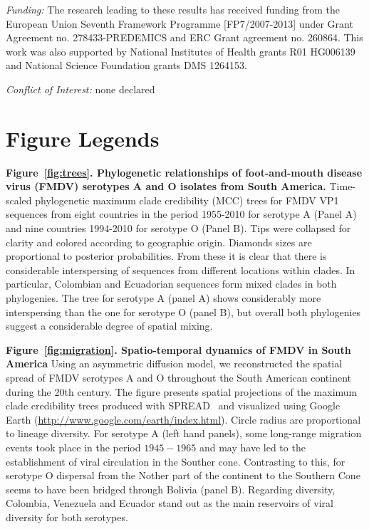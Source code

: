 \documentclass[10pt]{article}
\begin{document}
\emph{Funding:} The research leading to these results has received funding from the European Union Seventh Framework Programme [FP7/2007-2013] under Grant Agreement no. 278433-PREDEMICS and ERC Grant agreement no. 260864.
This work was also supported by National Institutes of Health grants R01 HG006139 and National Science Foundation grants DMS 1264153.

\emph{Conflict of Interest:} none declared

\newpage

\newpage
\section*{Figure Legends}


{\bf Figure~\ref{fig:trees}. Phylogenetic relationships of foot-and-mouth disease virus (FMDV) serotypes A and O isolates from South America.} Time-scaled phylogenetic maximum clade credibility (MCC) trees for FMDV VP1 sequences from eight countries in the period 1955-2010 for serotype A (Panel A) and nine countries 1994-2010 for serotype O (Panel B).
Tips were collapsed for clarity and colored according to geographic origin.
Diamonds sizes are proportional to posterior probabilities.
From these it is clear that there is considerable interspersing of sequences from different locations within clades.
In particular, Colombian and Ecuadorian sequences form mixed clades in both phylogenies.
The tree for serotype A (panel A) shows considerably more interspersing than the one for serotype O (panel B), but overall both phylogenies suggest a considerable degree of spatial mixing.

{\bf Figure~\ref{fig:migration}. Spatio-temporal dynamics of FMDV in South America} Using an asymmetric diffusion model, we reconstructed the spatial spread of FMDV serotypes A and O throughout the South American continent during the 20th century.
The figure presents spatial projections of the maximum clade credibility trees produced with SPREAD~\cite{spread} and visualized using Google Earth (\url{http://www.google.com/earth/index.html}).
Circle radius are proportional to lineage diversity.
For serotype A (left hand panels), some long-range migration events took place in the period $1945-1965$ and may have led to the establishment of viral circulation in the Souther cone.
Contrasting to this, for serotype O dispersal from the Nother part of the continent to the Southern Cone seems to have been bridged through Bolivia (panel B).
Regarding diversity, Colombia, Venezuela and Ecuador stand out as the main reservoirs of viral diversity for both serotypes.
\end{document}
